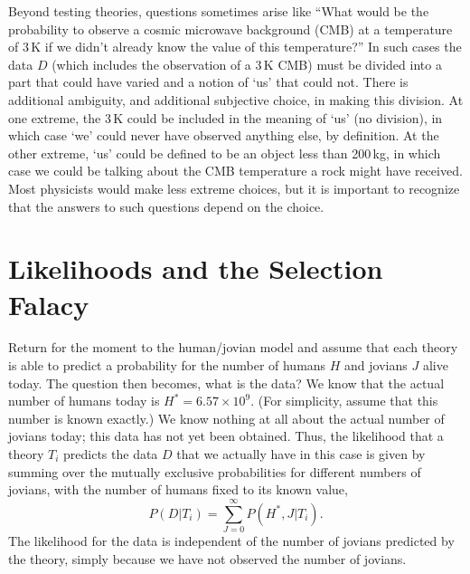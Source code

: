 \documentclass[pra,twocolumn,nofootinbib,eqsecnum,floatfix]{revtex4}
\begin{document}
Beyond testing theories, questions sometimes arise like ``What would be the probability to observe a cosmic microwave background (CMB) at a temperature of 3$\,$K if we didn't already know the value of this temperature?''  In such cases the data $D$ (which includes the observation of a 3$\,$K CMB) must be divided into a part that could have varied and a notion of `us' that could not. There is additional ambiguity, and additional subjective choice, in making this division. At one extreme, the 3$\,$K could be included in the meaning of `us' (no division), in which case `we' could never have observed anything else, by definition. At the other extreme, `us' could be defined to be an object less than 200$\,$kg, in which case we could be talking about the CMB temperature a rock might have received.  Most physicists would make less extreme choices, but it is important to recognize that the answers to such questions depend on the choice. 

\section{Likelihoods and the Selection Falacy}

Return for the moment  to the human/jovian model and assume that each theory is able to predict a probability for the
number of humans $H$ and jovians $J$ alive today.  
The question then becomes, what is the data?  
We know that the actual number of humans today is ${H^*}=6.57\times 10^9$.  
(For simplicity, assume that this number is known exactly.)   
We know nothing at all about the actual number of jovians today; this data has not yet been 
obtained.  Thus, the likelihood that a theory $T_i$ predicts the data $D$ that we actually have 
in this case is given by summing over the mutually exclusive probabilities for different numbers
of jovians, with the number of humans fixed to its known value,
\begin{equation}
P(D|T_i) = \sum_{J=0}^\infty P({H^*},J|T_i)  .
\label{PDT}
\end{equation} 
The likelihood for the data is independent of the number of jovians predicted by
the theory, simply because we have not observed the number of jovians.
\end{document}
